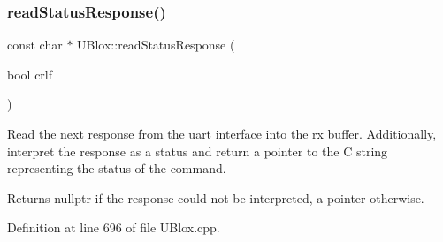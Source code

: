 \subsubsection{\texorpdfstring{read\+Status\+Response()}{readStatusResponse()}}
{\footnotesize\ttfamily const char $\ast$ U\+Blox\+::read\+Status\+Response (\begin{DoxyParamCaption}\item[{bool}]{crlf }\end{DoxyParamCaption})\hspace{0.3cm}{\ttfamily [private]}}

Read the next response from the uart interface into the rx buffer. Additionally, interpret the response as a status and return a pointer to the C string representing the status of the command.

\begin{DoxyReturn}{Returns}
nullptr if the response could not be interpreted, a pointer otherwise. 
\end{DoxyReturn}


Definition at line 696 of file U\+Blox.\+cpp.


